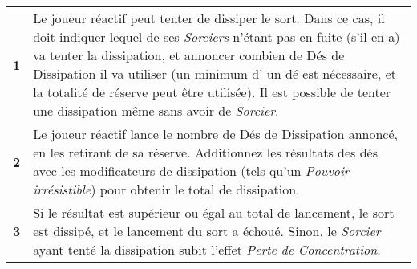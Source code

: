 \documentclass[a4paper,8pt]{extarticle}
\begin{document}
\begin{minipage}[t]{.47\linewidth}
\begin{tabular}{c|m{6.8cm}}
\textbf{1} & Le joueur réactif peut tenter de dissiper le sort. Dans ce cas, il doit indiquer lequel de ses \emph{Sorciers} n'étant pas en fuite (s'il en a) va tenter la dissipation, et annoncer combien de Dés de Dissipation il va utiliser (un minimum d' un dé est nécessaire, et la totalité de réserve peut être utilisée). Il est possible de tenter une dissipation même sans avoir de \emph{Sorcier}. \tabularnewline
\textbf{2} & Le joueur réactif lance le nombre de Dés de Dissipation annoncé, en les retirant de sa réserve. Additionnez les résultats des dés avec les modificateurs de dissipation (tels qu'un \emph{Pouvoir irrésistible}) pour obtenir le total de dissipation. \tabularnewline
\textbf{3} & Si le résultat est supérieur ou égal au total de lancement, le sort est dissipé, et le lancement du sort a échoué. Sinon, le \emph{Sorcier} ayant tenté la dissipation subit l'effet \emph{Perte de Concentration}. \tabularnewline
\end{tabular}

\end{minipage}
\hfill
\end{document}
